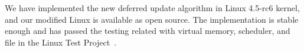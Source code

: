 We have implemented the new deferred update algorithm in Linux 4.5-rc6 kernel,
and our modified Linux is available as open source. 
The implementation is stable enough and has passed the testing
related with virtual memory, scheduler,
and file in the Linux Test Project~\cite{LTP}.

